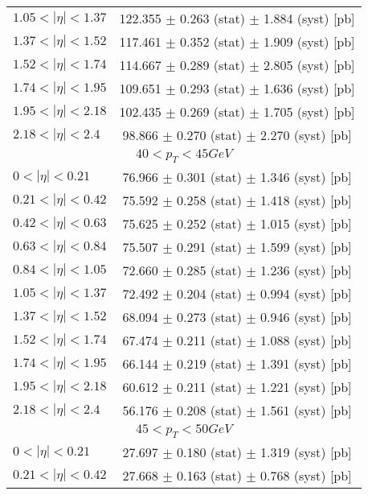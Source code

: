 \begin{tabular}{lc}
$1.05 < |\eta| <1.37$          & 122.355 $\pm$ 0.263 (stat) $\pm$ 1.884 (syst) [pb]  \\
$1.37 < |\eta| <1.52$          & 117.461 $\pm$ 0.352 (stat) $\pm$ 1.909 (syst) [pb]  \\
$1.52 < |\eta| <1.74$          & 114.667 $\pm$ 0.289 (stat) $\pm$ 2.805 (syst) [pb]  \\
$1.74 < |\eta| <1.95$          & 109.651 $\pm$ 0.293 (stat) $\pm$ 1.636 (syst) [pb]  \\
$1.95 < |\eta| <2.18$          & 102.435 $\pm$ 0.269 (stat) $\pm$ 1.705 (syst) [pb]  \\
$2.18 < |\eta| <2.4$           & 98.866 $\pm$ 0.270 (stat) $\pm$ 2.270 (syst) [pb]  \\
\hline
\multicolumn{2}{c}{$40 < p_{T} < 45 GeV$} \\
\hline
$0 < |\eta| <0.21$             & 76.966 $\pm$ 0.301 (stat) $\pm$ 1.346 (syst) [pb]  \\
$0.21 < |\eta| <0.42$          & 75.592 $\pm$ 0.258 (stat) $\pm$ 1.418 (syst) [pb]  \\
$0.42 < |\eta| <0.63$          & 75.625 $\pm$ 0.252 (stat) $\pm$ 1.015 (syst) [pb]  \\
$0.63 < |\eta| <0.84$          & 75.507 $\pm$ 0.291 (stat) $\pm$ 1.599 (syst) [pb]  \\
$0.84 < |\eta| <1.05$          & 72.660 $\pm$ 0.285 (stat) $\pm$ 1.236 (syst) [pb]  \\
$1.05 < |\eta| <1.37$          & 72.492 $\pm$ 0.204 (stat) $\pm$ 0.994 (syst) [pb]  \\
$1.37 < |\eta| <1.52$          & 68.094 $\pm$ 0.273 (stat) $\pm$ 0.946 (syst) [pb]  \\
$1.52 < |\eta| <1.74$          & 67.474 $\pm$ 0.211 (stat) $\pm$ 1.088 (syst) [pb]  \\
$1.74 < |\eta| <1.95$          & 66.144 $\pm$ 0.219 (stat) $\pm$ 1.391 (syst) [pb]  \\
$1.95 < |\eta| <2.18$          & 60.612 $\pm$ 0.211 (stat) $\pm$ 1.221 (syst) [pb]  \\
$2.18 < |\eta| <2.4$           & 56.176 $\pm$ 0.208 (stat) $\pm$ 1.561 (syst) [pb]  \\
\hline
\multicolumn{2}{c}{$45 < p_{T} < 50 GeV$} \\
\hline
$0 < |\eta| <0.21$             & 27.697 $\pm$ 0.180 (stat) $\pm$ 1.319 (syst) [pb]  \\
$0.21 < |\eta| <0.42$          & 27.668 $\pm$ 0.163 (stat) $\pm$ 0.768 (syst) [pb]  \\

\end{tabular}
